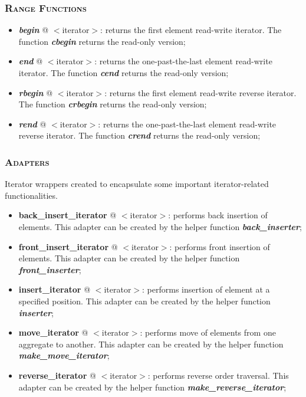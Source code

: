 \documentclass[10pt]{article}
\begin{document}
\begin{multicols*}{5}
{\subsubsection*{\textsc{Range Functions}} 
\begin{itemize}[leftmargin=*,topsep=0.25pt]
  \setlength\itemsep{-1.8pt}
	\item  \emph{\textbf{begin}} @ $<$iterator$>$: returns the first element read-write iterator. The function \emph{\textbf{cbegin}} returns the read-only version;
	\item  \emph{\textbf{end}} @ $<$iterator$>$: returns the one-past-the-last element read-write iterator. The function \emph{\textbf{cend}} returns the read-only version;
	\item  \emph{\textbf{rbegin}} @ $<$iterator$>$: returns the first element read-write reverse iterator. The function \emph{\textbf{crbegin}} returns the read-only version;
	\item  \emph{\textbf{rend}} @ $<$iterator$>$: returns the one-past-the-last element read-write reverse iterator. The function \emph{\textbf{crend}} returns the read-only version;
\end{itemize}

\subsubsection*{\textsc{Adapters}} 
\noindent
Iterator wrappers created to encapsulate some important iterator-related functionalities. 
\begin{itemize}[leftmargin=*,topsep=0.25pt]
  \setlength\itemsep{-1.8pt}
	\item \textbf{back\_insert\_iterator} @ $<$iterator$>$: performs back insertion of elements. This adapter can be created by the helper function \emph{\textbf{back\_inserter}};
	\item \textbf{front\_insert\_iterator} @ $<$iterator$>$: performs front insertion of elements. This adapter can be created by the helper function \emph{\textbf{front\_inserter}};
	\item \textbf{insert\_iterator} @ $<$iterator$>$: performs insertion of element at a specified position. This adapter can be created by the helper function \emph{\textbf{inserter}};
	\item \textbf{move\_iterator} @ $<$iterator$>$: performs move of elements from one aggregate to another. This adapter can be created by the helper function \emph{\textbf{make\_move\_iterator}};
	\item \textbf{reverse\_iterator} @ $<$iterator$>$: performs reverse order traversal. This adapter can be created by the helper function \emph{\textbf{make\_reverse\_iterator}};
\end{itemize}

}
\end{multicols*}
\end{document}
